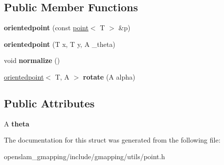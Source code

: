 \subsection*{Public Member Functions}
\begin{DoxyCompactItemize}
\item 
\mbox{\label{structGMapping_1_1orientedpoint_af196376304a22df53b15289ea4bd19b5}} 
{\bfseries orientedpoint} (const \hyperlink{structGMapping_1_1point}{point}$<$ T $>$ \&p)
\item 
\mbox{\label{structGMapping_1_1orientedpoint_afa2c29919cb2afea4a66cd7c3421c810}} 
{\bfseries orientedpoint} (T x, T y, A \+\_\+theta)
\item 
\mbox{\label{structGMapping_1_1orientedpoint_a57fc056ff866e541e45f16bde846067b}} 
void {\bfseries normalize} ()
\item 
\mbox{\label{structGMapping_1_1orientedpoint_af8b4834d4d254dbc5b17a5285e3c4a0f}} 
\hyperlink{structGMapping_1_1orientedpoint}{orientedpoint}$<$ T, A $>$ {\bfseries rotate} (A alpha)
\end{DoxyCompactItemize}
\subsection*{Public Attributes}
\begin{DoxyCompactItemize}
\item 
\mbox{\label{structGMapping_1_1orientedpoint_a610fdfefb42f5c836de7ab9e94ba11d0}} 
A {\bfseries theta}
\end{DoxyCompactItemize}


The documentation for this struct was generated from the following file\+:\begin{DoxyCompactItemize}
\item 
openslam\+\_\+gmapping/include/gmapping/utils/point.\+h\end{DoxyCompactItemize}
